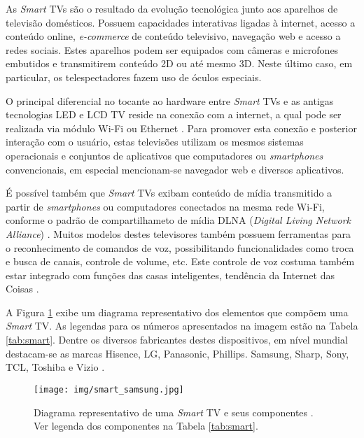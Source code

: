 
As \emph{Smart} TVs são o resultado da evolução tecnológica junto aos aparelhos de televisão domésticos. Possuem capacidades interativas ligadas à internet, acesso a conteúdo online, \emph{e-commerce} de conteúdo televisivo, navegação web e acesso a redes sociais. Estes aparelhos podem ser equipados com câmeras e microfones embutidos e transmitirem conteúdo 2D ou até mesmo 3D. Neste último caso, em particular, os telespectadores fazem uso de óculos especiais.

O principal diferencial no tocante ao hardware entre \emph{Smart} TVs e as antigas tecnologias LED e LCD TV reside na conexão com a internet, a qual pode ser realizada via módulo Wi-Fi ou Ethernet \cite{differencebetween,tomsguid:everythingsmart}. Para promover esta conexão e posterior interação com o usuário, estas televisões utilizam os mesmos sistemas operacionais e conjuntos de aplicativos que computadores ou \emph{smartphones} convencionais, em especial mencionam-se navegador web e diversos aplicativos.

É possível também que \emph{Smart} TVs exibam conteúdo de mídia transmitido a partir de \emph{smartphones} ou computadores conectados na mesma rede Wi-Fi, conforme o padrão de compartilhameto de mídia DLNA (\emph{Digital Living Network Alliance}) \cite{michele2014watch,shin2013smart,perakakis2015proposed,whatisasmarttv}. Muitos modelos destes televisores também possuem ferramentas para o reconhecimento de comandos de voz, possibilitando funcionalidades como troca e busca de canais, controle de volume, etc. Este controle de voz costuma também estar integrado com funções das casas inteligentes, tendência da Internet das Coisas \cite{tomsguid:everythingsmart}.

A Figura \ref{fig:smart_samsung} exibe um diagrama representativo dos elementos que compõem uma \emph{Smart} TV. As legendas para os números apresentados na imagem estão na Tabela \ref{tab:smart}. Dentre os diversos fabricantes destes dispositivos,  em nível mundial destacam-se as marcas Hisence, LG, Panasonic, Phillips. Samsung, Sharp, Sony, TCL, Toshiba e Vizio \cite{tomsguid:everythingsmart}. 

\begin{figure}[h!]
	\texttt{[image: img/smart\_samsung.jpg]}
	\caption{Diagrama representativo de uma \emph{Smart} TV e seus componentes \cite{samsung:smarttv}. Ver legenda dos componentes na Tabela \ref{tab:smart}.}
	\label{fig:smart_samsung}
\end{figure}

